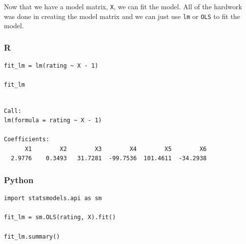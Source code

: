 \documentclass[
  letterpaper,
]{krantz}
\begin{document}
Now that we have a model matrix, \texttt{X}, we can fit the model. All
of the hardwork was done in creating the model matrix and we can just
use \texttt{lm} or \texttt{OLS} to fit the model.

\subsubsection{R}

\begin{verbatim}
fit_lm = lm(rating ~ X - 1)

fit_lm
\end{verbatim}

\begin{verbatim}

Call:
lm(formula = rating ~ X - 1)

Coefficients:
      X1        X2        X3        X4        X5        X6  
  2.9776    0.3493   31.7281  -99.7536  101.4611  -34.2938  
\end{verbatim}

\subsubsection{Python}

\begin{verbatim}
import statsmodels.api as sm

fit_lm = sm.OLS(rating, X).fit()

fit_lm.summary()
\end{verbatim}
\end{document}
